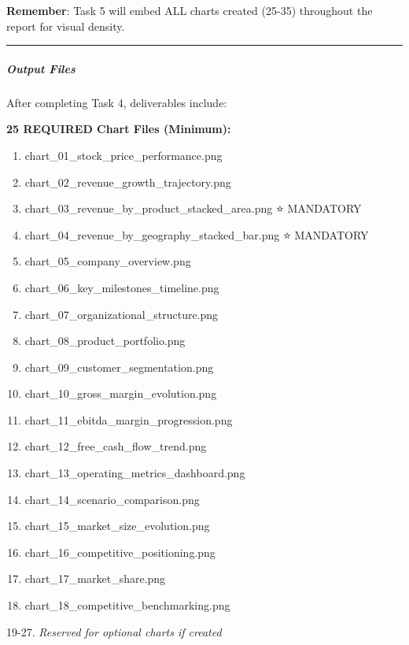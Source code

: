 \documentclass[11pt]{article}
\begin{document}
\textbf{Remember}: Task 5 will embed ALL charts created (25-35) throughout the report for visual density.


\vspace{0.5em}\hrule\vspace{0.5em}

\subparagraph{Output Files}\mbox{}\par

After completing Task 4, deliverables include:


\textbf{25 REQUIRED Chart Files (Minimum):}

\begin{enumerate}[leftmargin=*,itemsep=2pt,topsep=2pt]
\item {} chart\_\allowbreak{}01\_\allowbreak{}stock\_\allowbreak{}price\_\allowbreak{}performance.png
\item {} chart\_\allowbreak{}02\_\allowbreak{}revenue\_\allowbreak{}growth\_\allowbreak{}trajectory.png
\item {} chart\_\allowbreak{}03\_\allowbreak{}revenue\_\allowbreak{}by\_\allowbreak{}product\_\allowbreak{}stacked\_\allowbreak{}area.png ⭐ MANDATORY
\item {} chart\_\allowbreak{}04\_\allowbreak{}revenue\_\allowbreak{}by\_\allowbreak{}geography\_\allowbreak{}stacked\_\allowbreak{}bar.png ⭐ MANDATORY
\item {} chart\_\allowbreak{}05\_\allowbreak{}company\_\allowbreak{}overview.png
\item {} chart\_\allowbreak{}06\_\allowbreak{}key\_\allowbreak{}milestones\_\allowbreak{}timeline.png
\item {} chart\_\allowbreak{}07\_\allowbreak{}organizational\_\allowbreak{}structure.png
\item {} chart\_\allowbreak{}08\_\allowbreak{}product\_\allowbreak{}portfolio.png
\item {} chart\_\allowbreak{}09\_\allowbreak{}customer\_\allowbreak{}segmentation.png
\item {} chart\_\allowbreak{}10\_\allowbreak{}gross\_\allowbreak{}margin\_\allowbreak{}evolution.png
\item {} chart\_\allowbreak{}11\_\allowbreak{}ebitda\_\allowbreak{}margin\_\allowbreak{}progression.png
\item {} chart\_\allowbreak{}12\_\allowbreak{}free\_\allowbreak{}cash\_\allowbreak{}flow\_\allowbreak{}trend.png
\item {} chart\_\allowbreak{}13\_\allowbreak{}operating\_\allowbreak{}metrics\_\allowbreak{}dashboard.png
\item {} chart\_\allowbreak{}14\_\allowbreak{}scenario\_\allowbreak{}comparison.png
\item {} chart\_\allowbreak{}15\_\allowbreak{}market\_\allowbreak{}size\_\allowbreak{}evolution.png
\item {} chart\_\allowbreak{}16\_\allowbreak{}competitive\_\allowbreak{}positioning.png
\item {} chart\_\allowbreak{}17\_\allowbreak{}market\_\allowbreak{}share.png
\item {} chart\_\allowbreak{}18\_\allowbreak{}competitive\_\allowbreak{}benchmarking.png
\end{enumerate}
19-27. \emph{Reserved for optional charts if created}
\end{document}
